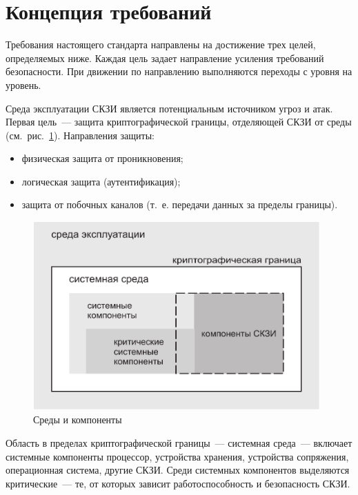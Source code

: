 \section{Концепция требований}\label{COMMON.Concept}

Требования настоящего стандарта направлены на достижение трех целей, 
определяемых ниже. Каждая цель задает направление усиления
требований безопасности. При движении по направлению выполняются переходы с
уровня на уровень.

Среда эксплуатации СКЗИ является потенциальным источником угроз и атак. 
%
%
Первая цель~--- защита криптографической границы, отделяющей СКЗИ от среды
(см.~рис.~\ref{Fig.COMMON.Concept}).
%
Направления защиты:
\begin{itemize}
\item
физическая защита от проникновения;
\item
логическая защита (аутентификация);
\item
защита от побочных каналов (т.~е. передачи данных за пределы границы).
\end{itemize}

\begin{figure}[bht]
\begin{center}
\includegraphics[width=11cm]{../figs/env}
\end{center}
\caption{Среды и компоненты}\label{Fig.COMMON.Concept}
\end{figure}

Область в пределах криптографической границы~--- системная среда~---
включает системные компоненты\addendum{:} процессор, устройства хранения, 
устройства сопряжения, операционная система, другие СКЗИ. 
%
Среди системных компонентов выделяются критические~--- те, от которых зависит  
работоспособность и безопасность СКЗИ. 


